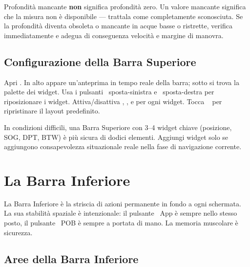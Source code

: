 \begin{warningbox}
Profondità mancante \textbf{non} significa profondità zero.
Un valore mancante significa che la misura non è disponibile --- trattala come
completamente sconosciuta.
Se la profondità diventa obsoleta o mancante in acque basse o ristrette, verifica
immediatamente e adegua di conseguenza velocità e margine di manovra.
\end{warningbox}

\section{Configurazione della Barra Superiore}

Apri .
In alto appare un'anteprima in tempo reale della barra; sotto si trova la palette dei widget.
Usa i pulsanti ~sposta-sinistra e ~sposta-destra
per riposizionare i widget.
Attiva/disattiva , ,  e 
per ogni widget.
Tocca ~ per ripristinare il layout predefinito.

\begin{tipbox}
In condizioni difficili, una Barra Superiore con 3--4 widget chiave (posizione, SOG, DPT, BTW)
è più sicura di dodici elementi.
Aggiungi widget solo se aggiungono consapevolezza situazionale reale nella fase di navigazione corrente.
\end{tipbox}

\chapter{La Barra Inferiore}
\label{ch:barrainferiore}

La Barra Inferiore è la striscia di azioni permanente in fondo a ogni schermata.
La sua stabilità spaziale è intenzionale: il pulsante ~App è sempre
nello stesso posto, il pulsante ~POB è sempre a portata di mano.
La memoria muscolare è sicurezza.


\section{Aree della Barra Inferiore}

